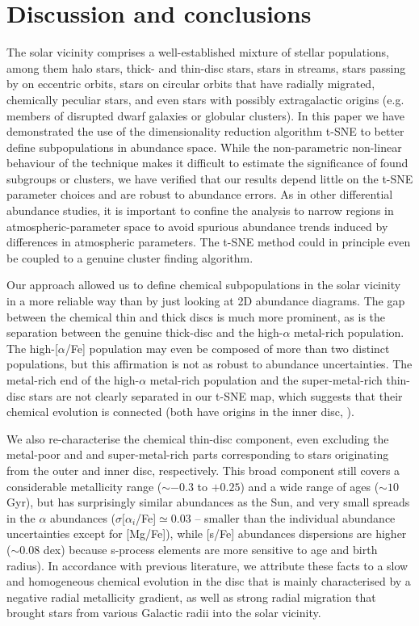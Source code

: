 \documentclass{aa}  %
\begin{document}
\section{Discussion and conclusions}\label{conclusions}

The solar vicinity comprises a well-established mixture of stellar populations, among them halo stars, thick- and thin-disc stars, stars in streams, stars passing by on eccentric orbits, stars on circular orbits that have radially migrated, chemically peculiar stars, and even stars with possibly extragalactic origins (e.g. members of disrupted dwarf galaxies or globular clusters). 
In this paper we have demonstrated the use of the dimensionality reduction algorithm t-SNE to better define subpopulations in abundance space. While the non-parametric non-linear behaviour of the technique makes it difficult to estimate the significance of found subgroups or clusters, we have verified that our results depend little on the t-SNE parameter choices and are robust to abundance errors. As in other differential abundance studies, it is important to confine the analysis to narrow regions in atmospheric-parameter space to avoid spurious abundance trends induced by differences in atmospheric parameters. The t-SNE method could in principle even be coupled to a genuine cluster finding algorithm. 

Our approach allowed us to define chemical subpopulations in the solar vicinity in a more reliable way than by just looking at 2D abundance diagrams. The gap between the chemical thin and thick discs is much more prominent, as is the separation between the genuine thick-disc and the high-$\alpha$ metal-rich population. The high-[$\alpha$/Fe] population may even be composed of more than two distinct populations, but this affirmation is not as robust to abundance uncertainties. The metal-rich end of the high-$\alpha$ metal-rich population and the super-metal-rich thin-disc stars are not clearly separated in our t-SNE map, which suggests that their chemical evolution is connected (both have origins in the inner disc, \citealt[][see also Chiappini et al., in prep.]{Adibekyan2012, Haywood2018}). 

We also re-characterise the chemical thin-disc component, even excluding the metal-poor and and super-metal-rich parts corresponding to stars originating from the outer and inner disc, respectively. This broad component still covers a considerable metallicity range ($\sim-0.3$ to $+0.25$) and a wide range of ages ($\sim10$ Gyr), but has surprisingly similar abundances as the Sun, and very small spreads in the $\alpha$ abundances ($\sigma[\alpha_i$/Fe]$\simeq0.03$ -- smaller than the individual abundance uncertainties except for [Mg/Fe]), while [s/Fe] abundances dispersions are higher ($\sim0.08$ dex) because s-process elements are more sensitive to age and birth radius). In accordance with previous literature, we attribute these facts to a slow and homogeneous chemical evolution in the disc that is mainly characterised by a negative radial metallicity gradient, as well as strong radial migration that brought stars from various Galactic radii into the solar vicinity.
\end{document}
